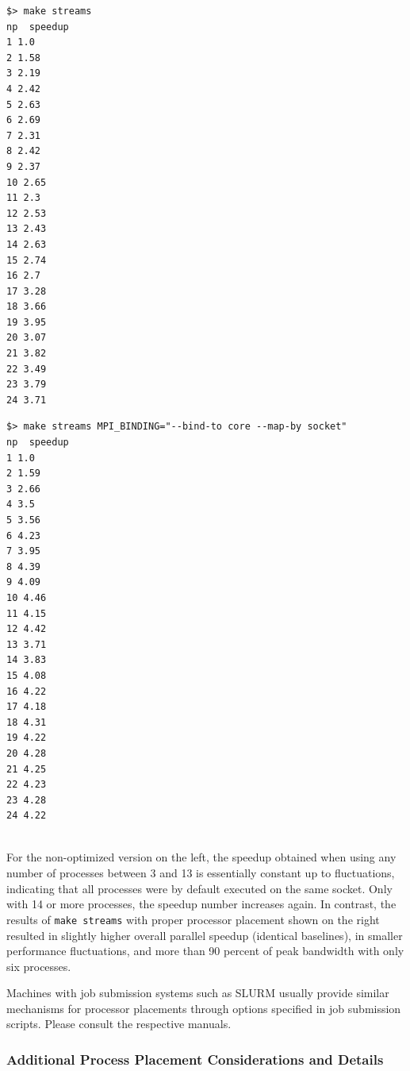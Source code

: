 {{\begin{minipage}{0.2\textwidth}
\begin{lstlisting}[escapechar=\#]
$> make streams
np  speedup
1 1.0
2 1.58
3 2.19
4 2.42
5 2.63
6 2.69
7 2.31
8 2.42
9 2.37
10 2.65
11 2.3
12 2.53
13 2.43
14 2.63
15 2.74
16 2.7
17 3.28
18 3.66
19 3.95
20 3.07
21 3.82
22 3.49
23 3.79
24 3.71
\end{lstlisting}
\end{minipage} \hfill
\begin{minipage}{0.75\textwidth}
\begin{lstlisting}[escapechar=\#]
$> make streams MPI_BINDING="--bind-to core --map-by socket"
np  speedup
1 1.0
2 1.59
3 2.66
4 3.5
5 3.56
6 4.23
7 3.95
8 4.39
9 4.09
10 4.46
11 4.15
12 4.42
13 3.71
14 3.83
15 4.08
16 4.22
17 4.18
18 4.31
19 4.22
20 4.28
21 4.25
22 4.23
23 4.28
24 4.22
\end{lstlisting}
\end{minipage} \\
For the non-optimized version on the left, the speedup obtained when using any number of processes between 3 and 13 is essentially constant up to fluctuations, indicating that all processes were by default executed on the same socket.
Only with 14 or more processes, the speedup number increases again.
In contrast, the results of \lstinline|make streams| with proper processor placement shown on the right resulted in slightly higher overall parallel speedup (identical baselines), in smaller performance fluctuations, and more than 90 percent of peak bandwidth with only six processes.

Machines with job submission systems such as SLURM usually provide similar mechanisms for processor placements through options specified in job submission scripts.
Please consult the respective manuals.

\subsubsection{Additional Process Placement Considerations and Details}

}}
